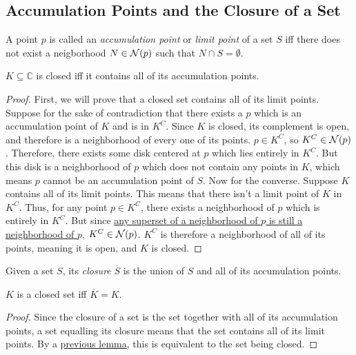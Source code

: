\documentclass{refbook}
\begin{document}
\subsection{Accumulation Points and the Closure of a Set}
\begin{definition}
A point $p$ is called an \emph{accumulation point} or \emph{limit point} of a set $S$ iff there does not exist a neigborhood $N \in \operatorname{\mathcal{N}}({p})$ such that $N \cap S = \emptyset$.
\end{definition}
\begin{lemma}
$K \subseteq \mathbb{C}$ is closed iff it contains all of its accumulation points.
\end{lemma}
\begin{proof}
First, we will prove that a closed set contains all of its limit points.
Suppose for the sake of contradiction that there exists a $p$ which is an accumulation point of $K$ and is in $K^C$. Since $K$ is closed, its complement is open, and therefore is a neighborhood of every one of its points. $p \in K^C$, so $K^C \in \operatorname{\mathcal{N}}({p})$. Therefore, there exists some disk centered at $p$ which lies entirely in $K^C$. But this disk is a neighborhood of $p$ which does not contain any points in $K$, which means $p$ cannot be an accumulation point of $S$.
Now for the converse. Suppose $K$ contains all of its limit points. This means that there isn't a limit point of $K$ in $K^C$. Thus, for any point $p \in K^C$, there exists a neighborhood of $p$ which is entirely in $K^C$. But since \hyperlink{Supersets of Neighborhoods}{any superset of a neighborhood of $p$ is still a neighborhood of $p$}, $K^C \in \operatorname{\mathcal{N}}({p})$. $K^C$ is therefore a neighborhood of all of its points, meaning it is open, and $K$ is closed.
\end{proof}
\begin{definition}
Given a set $S$, its \emph{closure} $\overline{S}$ is the union of $S$ and all of its accumulation points.
\end{definition}
\begin{lemma}
$K$ is a closed set iff $\overline{K} = K$.
\end{lemma}
\begin{proof}
Since the closure of a set is the set together with all of its accumulation points, a set equalling its closure means that the set contains all of its limit points. By a \hyperlink{Accumulation Points of a Closed Set}{previous lemma}, this is equivalent to the set being closed.
\end{proof}
\end{document}
